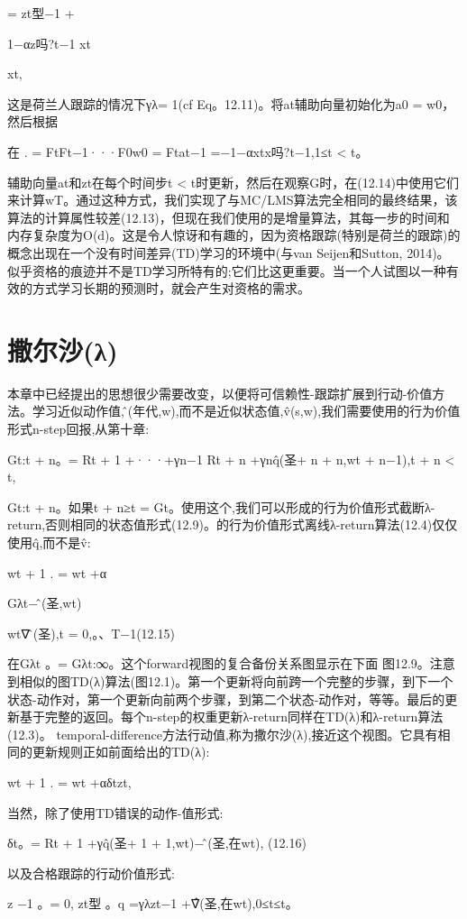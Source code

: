= zt型−1 +

1−αz吗?t−1 xt

xt,

这是荷兰人跟踪的情况下γλ= 1(cf Eq。12.11)。将at辅助向量初始化为a0 = w0，然后根据

在
.
= FtFt−1···F0w0 = Ftat−1 =−1−αxtx吗?t−1,1≤t < t。

辅助向量at和zt在每个时间步t < t时更新，然后在观察G时，在(12.14)中使用它们来计算wT。通过这种方式，我们实现了与MC/LMS算法完全相同的最终结果，该算法的计算属性较差(12.13)，但现在我们使用的是增量算法，其每一步的时间和内存复杂度为O(d)。这是令人惊讶和有趣的，因为资格跟踪(特别是荷兰的跟踪)的概念出现在一个没有时间差异(TD)学习的环境中(与van Seijen和Sutton, 2014)。似乎资格的痕迹并不是TD学习所特有的;它们比这更重要。当一个人试图以一种有效的方式学习长期的预测时，就会产生对资格的需求。


\section{撒尔沙(λ)}
本章中已经提出的思想很少需要改变，以便将可信赖性-跟踪扩展到行动-价值方法。学习近似动作值,问̂(年代,w),而不是近似状态值,v̂(s,w),我们需要使用的行为价值形式n-step回报,从第十章:

Gt:t + n。= Rt + 1 +···+γn−1 Rt + n +γnq̂(圣+ n + n,wt + n−1),t + n < t,

Gt:t + n。如果t + n≥t = Gt。使用这个,我们可以形成的行为价值形式截断λ-return,否则相同的状态值形式(12.9)。的行为价值形式离线λ-return算法(12.4)仅仅使用q̂,而不是v̂:


wt + 1
.
= wt +α

Gλt−问̂(圣,wt)

wt∇问̂(圣),t = 0,。、T−1(12.15)

在Gλt
。= Gλt:∞。这个forward视图的复合备份关系图显示在下面
图12.9。注意到相似的图TD(λ)算法(图12.1)。第一个更新将向前跨一个完整的步骤，到下一个状态-动作对，第一个更新向前两个步骤，到第二个状态-动作对，等等。最后的更新基于完整的返回。每个n-step的权重更新λ-return同样在TD(λ)和λ-return算法(12.3)。
temporal-difference方法行动值,称为撒尔沙(λ),接近这个视图。它具有相同的更新规则正如前面给出的TD(λ):

wt + 1
.
= wt +αδtzt,

当然，除了使用TD错误的动作-值形式:

δt。= Rt + 1 +γq̂(圣+ 1 + 1,wt)−问̂(圣,在wt), 					(12.16)

以及合格跟踪的行动价值形式:

z
−1
。= 0,
zt型
。q =γλzt−1 +∇̂(圣,在wt),0≤t≤t。

